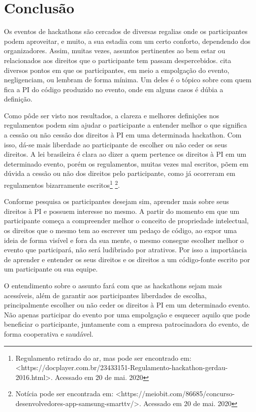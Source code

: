 \chapter{Conclusão}
\label{chp:conclusão}


Os eventos de hackathons são cercados de diversas regalias onde os participantes podem aproveitar, e muito, a sua estadia com um certo conforto, dependendo dos organizadores. Assim, muitas vezes, assuntos pertinentes ao bem estar ou relacionados aos direitos que o participante tem passam despercebidos. \citet{zukin2017hackathons} cita diversos pontos em que os participantes, em meio a empolgação do evento, negligenciam, ou lembram de forma mínima. Um deles é o tópico sobre com quem fica a PI do código produzido no evento, onde em alguns casos é dúbia a definição. \citep{steele_2013}

Como pôde ser visto nos resultados, a clareza e melhores definições nos regulamentos podem sim ajudar o participante a entender melhor o que significa a cessão ou não cessão dos direitos à PI em uma determinada hackathon. Com isso, dá-se mais liberdade ao participante de escolher ou não ceder os seus direitos. A lei brasileira é clara ao dizer a quem pertence os direitos à PI em um determinado evento, porém os regulamentos, muitas vezes mal escritos, põem em dúvida a cessão ou não dos direitos pelo participante, como já ocorreram em regulamentos bizarramente escritos\footnote{Regulamento retirado do ar, mas pode ser encontrado em: <https://docplayer.com.br/23433151-Regulamento-hackathon-gerdau-2016.html>. Acessado em 20 de mai. 2020} \footnote{Notícia pode ser encontrada em: <https://meiobit.com/86685/concurso-desenvolvedores-app-samsung-smarttv/>. Acessado em 20 de mai. 2020}.

Conforme pesquisa os participantes desejam sim, aprender mais sobre seus direitos à PI e possuem interesse no mesmo. A partir do momento em que um participante começa a compreender melhor o conceito de propriedade intelectual, os direitos que o mesmo tem ao escrever um pedaço de código, ao expor uma ideia de forma visível e fora da sua mente, o mesmo consegue escolher melhor o evento que participará, não será ludibriado por atrativos. Por isso a importância de aprender e entender os seus direitos e os direitos a um código-fonte escrito por um participante ou sua equipe.

O entendimento sobre o assunto fará com que as hackathons sejam mais acessíveis, além de garantir aos participantes liberdades de escolha, principalmente escolher ou não ceder os direitos à PI em um determinado evento. Não apenas participar do evento por uma empolgação e esquecer aquilo que pode beneficiar o participante, juntamente com a empresa patrocinadora do evento, de forma cooperativa e saudável.




